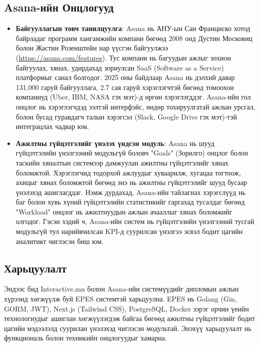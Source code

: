 \subsection{Asana-ийн Онцлогууд}
\begin{itemize}
    \item \textbf{Байгууллагын товч танилцуулга}: Asana нь АНУ-ын Сан Франциско хотод байрладаг 
    программ хангамжийн компани бөгөөд 2008 онд Дустин Московиц болон Жастин Розенштейн нар үүсгэн 
    байгуулжээ (\url{https://asana.com/features}). Тус компани нь багуудын ажлыг зохион байгуулах, 
    хянах, удирдахад зориулсан SaaS (Software as a Service) платформыг санал болгодог. 
    2025 оны байдлаар Asana нь дэлхий даяар 131,000 гаруй байгууллага, 2.7 сая гаруй хэрэглэгчтэй 
    бөгөөд томоохон компаниуд (Uber, IBM, NASA гэх мэт)-д өргөн хэрэглэгддэг. Asana-ийн гол онцлог 
    нь хэрэглэгчдэд ээлтэй интерфэйс, өндөр тохируулгатай ажлын урсгал, болон бусад гуравдагч 
    талын хэрэгсэл (Slack, Google Drive гэх мэт)-тэй интеграцлах чадвар юм.
    \item \textbf{Ажилтны гүйцэтгэлийг үнэлэх үндсэн модуль}: Asana нь шууд гүйцэтгэлийн 
    үнэлгээний модульгүй боловч "Goals" (Зорилго) онцлог болон таскийн хяналтын системээр 
    дамжуулан ажилтны гүйцэтгэлийг хянах боломжтой. Хэрэглэгчид тодорхой ажлуудыг хуваарилж, 
    хугацаа тогтоож, ахицыг хянах боломжтой бөгөөд энэ нь ажилтны гүйцэтгэлийг шууд бусаар 
    үнэлэхэд ашиглагддаг. Нэмж дурдахад, Asana-ийн тайлагнах хэрэгслүүд нь баг болон хувь 
    хүний гүйцэтгэлийн статистикийг гаргахад тусалдаг бөгөөд "Workload" онцлог нь ажилтнуудын 
    ажлын ачааллыг хянах боломжийг олгодог. Гэсэн хэдий ч, Asana-ийн систем нь гүйцэтгэлийн 
    үнэлгээний тусгай модульгүй тул нарийвчилсан KPI-д суурилсан үнэлгээ эсвэл бодит цагийн 
    аналитикт чиглэсэн биш юм.
\end{itemize}

\subsection{Харьцуулалт}
Эндээс бид Interactive.mn болон Asana-ийн системүүдийг дипломын ажлын хүрээнд хөгжүүлж буй 
EPES системтэй харьцуулна. EPES нь Golang (Gin, GORM, JWT), Next.js (Tailwind CSS), 
PostgreSQL, Docker зэрэг орчин үеийн технологиудыг ашиглан хөгжүүлэгдэж байгаа бөгөөд 
ажилтны гүйцэтгэлийг бодит цагийн мэдээлэлд суурилан үнэлэхэд чиглэсэн модультай. 
Энэхүү харьцуулалт нь функциональ болон техникийн онцлогуудыг хамарна.

